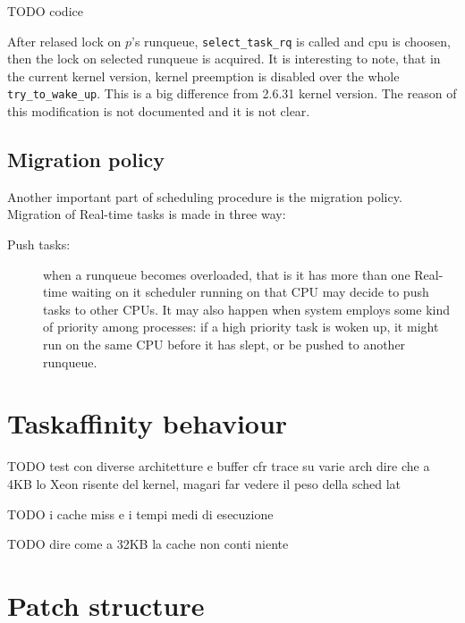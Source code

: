 TODO codice 

After relased lock on $p$'s runqueue, \texttt{select\_task\_rq} is called and cpu is choosen, then the lock on selected runqueue is acquired.
It is interesting to note, that in the current kernel version, kernel preemption is disabled over the whole \texttt{try\_to\_wake\_up}. This is a big 
difference from 2.6.31 kernel version. The reason of this modification is not documented and it is not clear.

\subsection{Migration policy}

Another important part of scheduling procedure is the migration policy. Migration of Real-time tasks is made in three way: 

\begin{description}
\item[Push tasks:] when a runqueue becomes overloaded, that is it has more than one Real-time waiting on it  scheduler running on that CPU may decide to push tasks to other CPUs. It may also happen when system 
employs some kind of priority among processes: if a high priority task is woken up, it might run on the same CPU before it has slept, or be pushed to 
another runqueue.

\end{description}










\section{Taskaffinity behaviour}

TODO test con diverse architetture e buffer cfr trace su varie arch dire che a 4KB lo Xeon risente del kernel, magari far vedere il peso della sched lat

TODO i cache miss e i tempi medi di esecuzione

TODO dire come a 32KB la cache non conti niente

\section{Patch structure}

